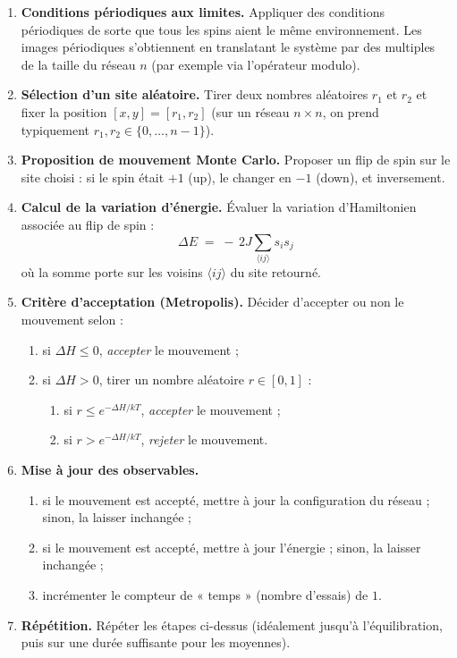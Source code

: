 \documentclass[a4paper,11pt]{article}
\begin{document}
\begin{enumerate}
  \item \textbf{Conditions périodiques aux limites.} Appliquer des conditions périodiques de sorte que tous les spins aient le même environnement. Les images périodiques s’obtiennent en translatant le système par des multiples de la taille du réseau $n$ (par exemple via l’opérateur modulo).

  \item \textbf{Sélection d’un site aléatoire.} Tirer deux nombres aléatoires $r_1$ et $r_2$ et fixer la position $[x,y] = [r_1,r_2]$ (sur un réseau $n \times n$, on prend typiquement $r_1,r_2 \in \{0,\ldots,n-1\}$).

  \item \textbf{Proposition de mouvement Monte Carlo.} Proposer un flip de spin sur le site choisi : si le spin était $+1$ (up), le changer en $-1$ (down), et inversement.

  \item \textbf{Calcul de la variation d’énergie.} Évaluer la variation d’Hamiltonien associée au flip de spin :
        \[
        \Delta E \;=\; -\,2J \sum_{\langle i j \rangle} s_i s_j
        \tag{8}
        \]
        où la somme porte sur les voisins $\langle i j \rangle$ du site retourné.

  \item \textbf{Critère d’acceptation (Metropolis).} Décider d’accepter ou non le mouvement selon :
        \begin{enumerate}
          \item si $\Delta H \le 0$, \emph{accepter} le mouvement ;
          \item si $\Delta H > 0$, tirer un nombre aléatoire $r \in [0,1]$ :
                \begin{enumerate}
                  \item si $r \le e^{-\Delta H/kT}$, \emph{accepter} le mouvement ;
                  \item si $r > e^{-\Delta H/kT}$, \emph{rejeter} le mouvement.
                \end{enumerate}
        \end{enumerate}

  \item \textbf{Mise à jour des observables.}
        \begin{enumerate}
          \item si le mouvement est accepté, mettre à jour la configuration du réseau ; sinon, la laisser inchangée ;
          \item si le mouvement est accepté, mettre à jour l’énergie ; sinon, la laisser inchangée ;
          \item incrémenter le compteur de « temps » (nombre d’essais) de $1$.
        \end{enumerate}

  \item \textbf{Répétition.} Répéter les étapes ci-dessus (idéalement jusqu’à l’équilibration, puis sur une durée suffisante pour les moyennes).
\end{enumerate}
\end{document}
